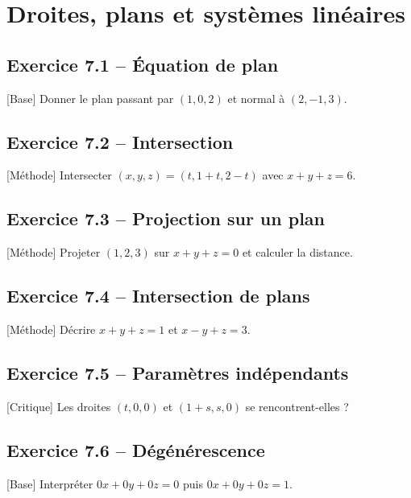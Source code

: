 \chapter{Droites, plans et systèmes linéaires}
\section*{Exercice 7.1 -- Équation de plan}
[Base] Donner le plan passant par $(1,0,2)$ et normal à $(2,-1,3)$.

\section*{Exercice 7.2 -- Intersection}
[Méthode] Intersecter $(x,y,z)=(t,1+t,2-t)$ avec $x+y+z=6$.

\section*{Exercice 7.3 -- Projection sur un plan}
[Méthode] Projeter $(1,2,3)$ sur $x+y+z=0$ et calculer la distance.

\section*{Exercice 7.4 -- Intersection de plans}
[Méthode] Décrire $x+y+z=1$ et $x-y+z=3$.

\section*{Exercice 7.5 -- Paramètres indépendants}
[Critique] Les droites $(t,0,0)$ et $(1+s,s,0)$ se rencontrent-elles ?

\section*{Exercice 7.6 -- Dégénérescence}
[Base] Interpréter $0x+0y+0z=0$ puis $0x+0y+0z=1$.
